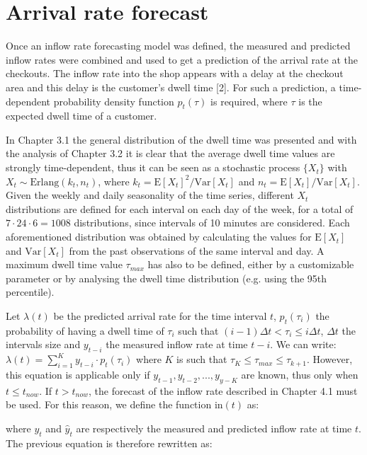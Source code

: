 \section{Arrival rate forecast}
\label{sec:arrival_rate_forecast}
Once an inflow rate forecasting model was defined, the measured and predicted inflow rates were combined and used to get a prediction of the arrival rate at the checkouts. The inflow rate into the shop appears with a delay at the checkout area and this delay is the customer's dwell time [2]. For such a prediction, a time-dependent probability density function $ p_t(\tau) $ is required, where $ \tau $ is the expected dwell time of a customer.

In Chapter 3.1 the general distribution of the dwell time was presented and with the analysis of Chapter 3.2 it is clear that the average dwell time values are strongly time-dependent, thus it can be seen as a stochastic process $ \{ X_t \} $ with $ X_t \sim \text{Erlang}(k_t, n_t) $, where $ k_t = \text{E}[X_t]^2 / \text{Var}[X_t] $ and $ n_t =  \text{E}[X_t] / \text{Var}[X_t] $. Given the weekly and daily seasonality of the time series, different $ X_t $ distributions are defined for each interval on each day of the week, for a total of $ 7 \cdot 24 \cdot 6 = 1008 $ distributions, since intervals of 10 minutes are considered. Each aforementioned distribution was obtained by calculating the values for $ \text{E}[X_t] $ and $ \text{Var}[X_t] $ from the past observations of the same interval and day. A maximum dwell time value $ \tau_{max} $ has also to be defined, either by a customizable parameter or by analysing the dwell time distribution (e.g. using the 95th percentile).

Let $ \lambda(t) $ be the predicted arrival rate for the time interval $ t $, $ p_t(\tau_i) $ the probability of having a dwell time of $ \tau_i $ such that $ (i-1) \Delta t < \tau_i \leq i \Delta t $, $ \Delta t $ the intervals size and $ y_{t-i} $ the measured inflow rate at time $ t-i $. We can write:
$ \lambda(t) = \sum_{i=1}^{K} y_{t-i} \cdot p_t(\tau_i) $
where $ K $ is such that $ \tau_K \leq \tau_{max} \leq \tau_{k+1}  $. However, this equation is applicable only if $ y_{t-1}, y_{t-2}, ..., y_{y-K} $ are known, thus only when $ t \leq t_{now} $. If $ t > t_{now} $, the forecast of the inflow rate described in Chapter 4.1 must be used. For this reason, we define the function $ \text{in}(t) $ as:


where $ y_t $ and $ \hat{y}_t $ are respectively the measured and predicted inflow rate at time $ t $. The previous equation is therefore rewritten as:


